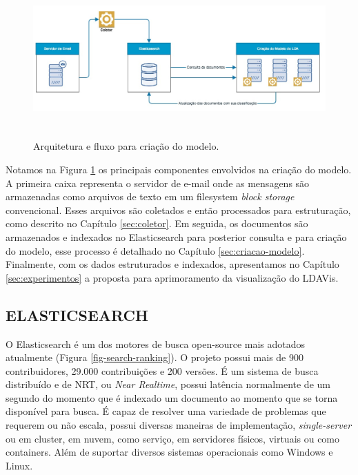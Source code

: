 \documentclass[12pt,a4paper]{article}
\begin{document}
\begin{figure}[H]
	\centering
  \includegraphics[height=6cm]{images/figure_11.jpg}
  \caption{Arquitetura e fluxo para criação do modelo.}
  \label{fig-framework-lda}
\end{figure}

Notamos na Figura \ref{fig-framework-lda} os principais componentes envolvidos na criação do modelo. A primeira caixa representa o servidor de 
 e-mail onde as mensagens são armazenadas como arquivos de texto em um filesystem \textit{block storage} convencional. Esses arquivos são coletados e então
 processados para estruturação, como descrito no Capítulo \ref{sec:coletor}. Em seguida, os documentos são armazenados e indexados no Elasticsearch para
 posterior consulta e para criação do modelo, esse processo é detalhado no Capítulo \ref{sec:criacao-modelo}. Finalmente, com os dados estruturados
 e indexados, apresentamos no Capítulo \ref{sec:experimentos} a proposta para aprimoramento da visualização do LDAVis.

\subsection{ELASTICSEARCH} \label{sec:elasticsearch}

O Elasticsearch é um dos motores de busca open-source mais adotados atualmente (Figura \ref{fig-search-ranking}). 
 O projeto possui mais de 900 contribuidores, 29.000
 contribuições e 200 versões. É um sistema de busca distribuído  e de NRT, ou \textit{Near Realtime}, possui latência normalmente de um segundo
 do momento que é indexado um documento ao momento que se torna disponível para busca. É capaz de resolver uma variedade de problemas que requerem ou não escala,
 possui diversas maneiras de implementação, \textit{single-server} ou em cluster, em nuvem, como serviço, em servidores físicos, virtuais ou como containers.
 Além de suportar diversos sistemas operacionais como Windows e Linux.
\end{document}
